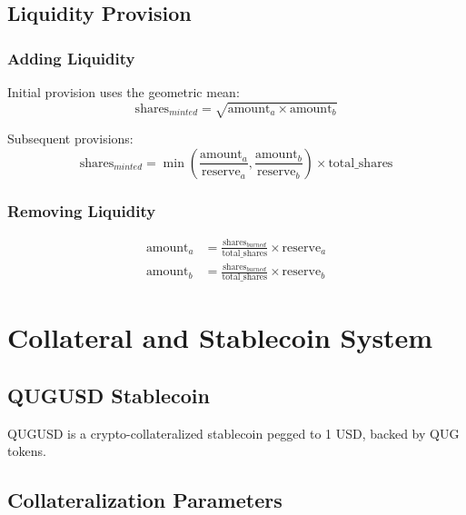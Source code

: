 \documentclass[11pt,a4paper]{article}
\begin{document}
\subsection{Liquidity Provision}

\subsubsection{Adding Liquidity}

Initial provision uses the geometric mean:
\begin{equation}
\text{shares}_{minted} = \sqrt{\text{amount}_a \times \text{amount}_b}
\end{equation}

Subsequent provisions:
\begin{equation}
\text{shares}_{minted} = \min\left(\frac{\text{amount}_a}{\text{reserve}_a}, \frac{\text{amount}_b}{\text{reserve}_b}\right) \times \text{total\_shares}
\end{equation}

\subsubsection{Removing Liquidity}

\begin{align}
\text{amount}_a &= \frac{\text{shares}_{burned}}{\text{total\_shares}} \times \text{reserve}_a \\
\text{amount}_b &= \frac{\text{shares}_{burned}}{\text{total\_shares}} \times \text{reserve}_b
\end{align}

\section{Collateral and Stablecoin System}

\subsection{QUGUSD Stablecoin}

QUGUSD is a crypto-collateralized stablecoin pegged to 1 USD, backed by QUG tokens.

\subsection{Collateralization Parameters}
\end{document}
